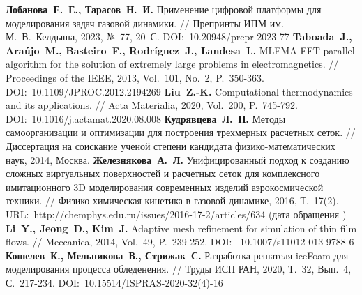 \begin{thebibliography}{99}

\textbf{Лобанова~Е.~Е., Тарасов~Н.~И.} Применение цифровой платформы для моделирования задач газовой динамики. // Препринты ИПМ им. М.~В.~Келдыша, 2023, №~77, 20~С. DOI:~10.20948/prepr-2023-77
\textbf{Taboada~J., Ara{\'u}jo~M., Basteiro~F., Rodr{\'i}guez~J., Landesa~L.} MLFMA-FFT parallel algorithm for the solution of extremely large problems in electromagnetics. // Proceedings of the IEEE, 2013, Vol.~101, No.~2, P.~350-363. DOI:~10.1109/JPROC.2012.2194269
\textbf{Liu~Z.-K.} Computational thermodynamics and its applications. // Acta Materialia, 2020, Vol.~200, P.~745-792. DOI:~10.1016/j.actamat.2020.08.008
\textbf{Кудрявцева~Л.~Н.} Методы самоорганизации и оптимизации для построения трехмерных расчетных сеток. // Диссертация на соискание ученой степени кандидата физико-математических наук, 2014, Москва.
\textbf{Железнякова~А.~Л.} Унифицированный подход к созданию сложных виртуальных поверхностей и расчетных сеток для комплексного имитационного 3D моделирования современных изделий аэрокосмической техники. // Физико-химическая кинетика в газовой динамике, 2016, Т.~17(2). URL:~http://chemphys.edu.ru/issues/2016-17-2/articles/634 (дата обращения \StrDate)
\textbf{Li~Y., Jeong~D., Kim~J.} Adaptive mesh refinement for simulation of thin film flows. // Meccanica, 2014, Vol.~49, P.~239-252. DOI:~ 10.1007/s11012-013-9788-6
\textbf{Кошелев~К., Мельникова~В., Стрижак~С.} Разработка решателя iceFoam для моделирования процесса обледенения. // Труды ИСП РАН, 2020, Т.~32, Вып.~4, С.~217-234. DOI:~10.15514/ISPRAS-2020-32(4)-16


\end{thebibliography}
